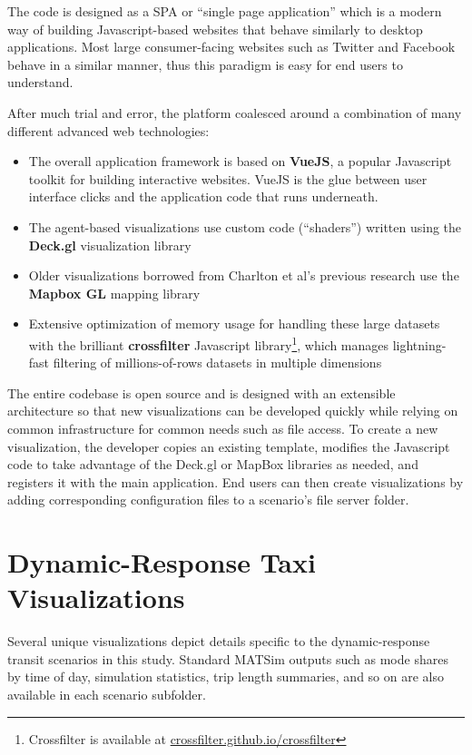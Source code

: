 The code is designed as a \gls{SPA} or ``single page application'' which is a modern way of building Javascript-based websites that behave similarly to desktop applications. Most large consumer-facing websites such as Twitter and Facebook behave in a similar manner, thus this paradigm is easy for end users to understand.

After much trial and error, the platform coalesced around a combination of many different advanced web technologies:

\begin{itemize}
  \item The overall application framework is based on \textbf{VueJS}, a popular Javascript toolkit for building interactive websites. VueJS is the glue between user interface clicks and the application code that runs underneath.
  \item The agent-based visualizations use custom code (``shaders'') written using the \textbf{Deck.gl} visualization library
  \item Older visualizations borrowed from Charlton et al's previous research use the \textbf{Mapbox GL} mapping library
  \item Extensive optimization of memory usage for handling these large datasets with the brilliant \textbf{crossfilter} Javascript library\footnote{Crossfilter is available at \href{https://crossfilter.github.io/crossfilter/}{crossfilter.github.io/crossfilter}}, which manages lightning-fast filtering of millions-of-rows datasets in multiple dimensions
\end{itemize}

The entire codebase is open source and is designed with an extensible architecture so that new visualizations can be developed quickly while relying on common infrastructure for common needs such as file access. To create a new visualization, the developer copies an existing template, modifies the Javascript code to take advantage of the Deck.gl or MapBox libraries as needed, and registers it with the main application. End users can then create visualizations by adding corresponding configuration files to a scenario's file server folder.

\section{Dynamic-Response Taxi Visualizations}
\label{avov-drtviz}

Several unique visualizations depict details specific to the dynamic-response transit scenarios in this study. Standard MATSim outputs such as mode shares by time of day, simulation statistics, trip length summaries, and so on are also available in each scenario subfolder.

